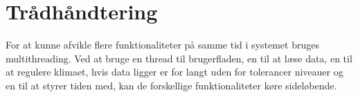 \section{Trådhåndtering}
For at kunne afvikle flere funktionaliteter på samme tid i systemet bruges multithreading. Ved at bruge en thread til brugerfladen, en til at læse data, en til at regulere klimaet, hvis data ligger er for langt uden for tolerancer niveauer og en til at styrer tiden med, kan de forskellige funktionaliteter køre sideløbende.